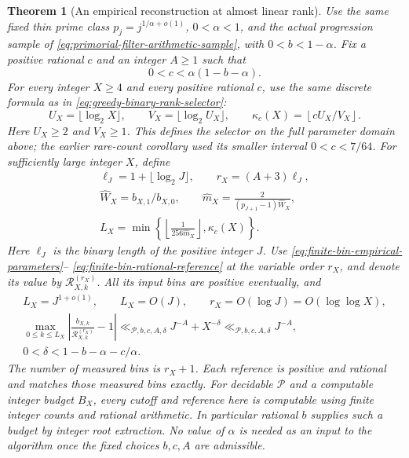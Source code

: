 \documentclass[11pt]{article}
\newtheorem{theorem}{Theorem}[section]
\theoremstyle{definition}
\begin{document}
\begin{theorem}[An empirical reconstruction at almost linear rank]
\label{thm:adaptive-bin-almost-linear}
Use the same fixed thin prime class
$p_j=j^{1/\alpha+o(1)}$, $0<\alpha<1$, and the actual
progression sample of
\eqref{eq:primorial-filter-arithmetic-sample}, with
$0<b<1-\alpha$.
Fix a positive rational $c$ and an integer $A\ge1$ such that
\begin{equation}
       0<c<\alpha(1-b-\alpha).
 \label{eq:adaptive-bin-parameter-domain}
\end{equation}
For every integer $X\ge4$ and every positive rational $c$,
use the same discrete formula as in
\eqref{eq:greedy-binary-rank-selector}:
\[
 U_X=\lfloor\log_2X\rfloor,\qquad
 V_X=\lfloor\log_2U_X\rfloor,\qquad
 \kappa_c(X)=\left\lfloor cU_X/V_X\right\rfloor .
\]
Here $U_X\ge2$ and $V_X\ge1$.
This defines the selector on the full parameter domain above;
the earlier rare-count corollary used its smaller interval
$0<c<7/64$.
For sufficiently large integer $X$, define
\begin{equation}
 \begin{gathered}
 \ell_J=1+\lfloor\log_2J\rfloor,\qquad r_X=(A+3)\ell_J,\\
 \widehat W_X=b_{X,1}/b_{X,0},\qquad
 \widehat m_X=\frac{2}{(p_{J+1}-1)\widehat W_X},\\
 L_X=\min\left\{
       \left\lfloor\frac1{256\widehat m_X}\right\rfloor,
                                      \kappa_c(X)\right\}.
 \end{gathered}
 \label{eq:adaptive-bin-computable-cutoff}
\end{equation}
Here $\ell_J$ is the binary length of the positive integer $J$.
Use \eqref{eq:finite-bin-empirical-parameters}--%
\eqref{eq:finite-bin-rational-reference} at the variable
order $r_X$, and denote its value by
$\mathcal R^{(r_X)}_{X,k}$.
All its input bins are positive eventually, and
\begin{equation}
 \begin{gathered}
 L_X=J^{1+o(1)},\qquad L_X=O(J),\qquad
 r_X=O(\log J)=O(\log\log X),\\
 \max_{0\le k\le L_X}
  \left|\frac{b_{X,k}}{\mathcal R^{(r_X)}_{X,k}}-1\right|
       \ll_{\mathcal P,b,c,A,\delta}J^{-A}+X^{-\delta}
       \ll_{\mathcal P,b,c,A,\delta}J^{-A},\\
 0<\delta<1-b-\alpha-c/\alpha .
 \end{gathered}
 \label{eq:adaptive-bin-relative-window}
\end{equation}
The number of measured bins is $r_X+1$.
Each reference is positive and rational and matches those
measured bins exactly.
For decidable $\mathcal P$ and a computable integer budget
$B_X$, every cutoff and reference here is computable using
finite integer counts and rational arithmetic.
In particular rational $b$ supplies such a budget by integer
root extraction.
No value of $\alpha$ is needed as an input to the algorithm
once the fixed choices $b,c,A$ are admissible.
\end{theorem}
\end{document}
